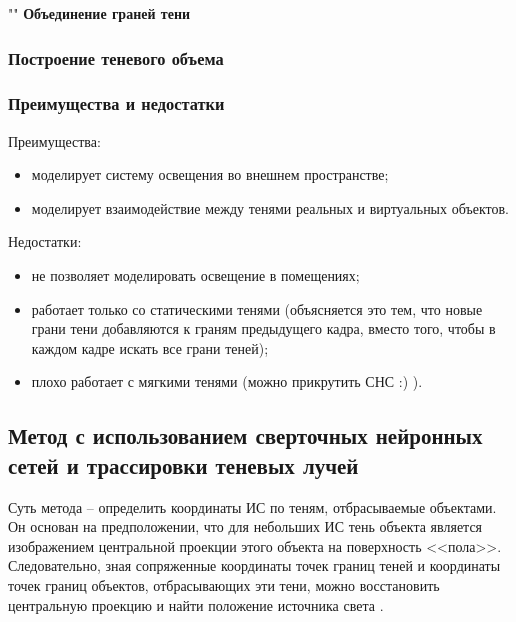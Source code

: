 ""\newline
\indent\textbf{Объединение граней тени}


\subsubsection*{Построение теневого объема}



\subsubsection*{Преимущества и недостатки}

Преимущества:
\begin{itemize}
	\item моделирует систему освещения во внешнем пространстве;
	\item моделирует взаимодействие между тенями реальных и виртуальных объектов.
\end{itemize}


Недостатки:
\begin{itemize}
	\item не позволяет моделировать освещение в помещениях;
	\item работает только со статическими тенями (объясняется это тем, что новые грани тени добавляются к граням предыдущего кадра, вместо того, чтобы в каждом кадре искать все грани теней);
	\item плохо работает с мягкими тенями (можно прикрутить СНС :) ).
\end{itemize}


\subsection{Метод с использованием сверточных нейронных сетей и трассировки теневых лучей}

Суть метода -- определить координаты ИС по теням, отбрасываемые объектами. Он основан на предположении, что для небольших ИС тень объекта является изображением центральной проекции этого объекта на поверхность <<пола>>. Следовательно, зная сопряженные координаты точек границ теней и координаты точек границ объектов, отбрасывающих эти тени, можно восстановить центральную проекцию и найти положение источника света \cite{sns_tras}.

